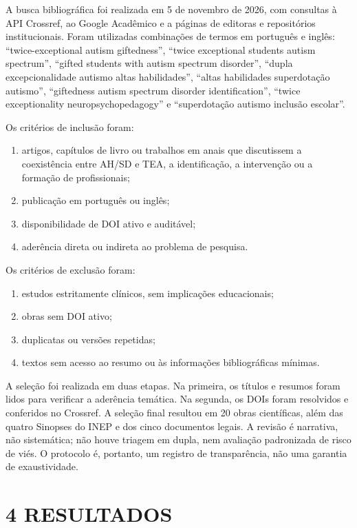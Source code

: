 A busca bibliográfica foi realizada em 5 de novembro de 2026, com
consultas à API Crossref, ao Google Acadêmico e a páginas de editoras e
repositórios institucionais. Foram utilizadas combinações de termos em
português e inglês: ``twice-exceptional autism giftedness'', ``twice
exceptional students autism spectrum'', ``gifted students with autism
spectrum disorder'', ``dupla excepcionalidade autismo altas
habilidades'', ``altas habilidades superdotação autismo'', ``giftedness
autism spectrum disorder identification'', ``twice exceptionality
neuropsychopedagogy'' e ``superdotação autismo inclusão escolar''.

Os critérios de inclusão foram:

\begin{enumerate}
\def\labelenumi{\alph{enumi})}
\item
  artigos, capítulos de livro ou trabalhos em anais que discutissem a
  coexistência entre AH/SD e TEA, a identificação, a intervenção ou a
  formação de profissionais;
\item
  publicação em português ou inglês;
\item
  disponibilidade de DOI ativo e auditável;
\item
  aderência direta ou indireta ao problema de pesquisa.
\end{enumerate}

Os critérios de exclusão foram:

\begin{enumerate}
\def\labelenumi{\alph{enumi})}
\item
  estudos estritamente clínicos, sem implicações educacionais;
\item
  obras sem DOI ativo;
\item
  duplicatas ou versões repetidas;
\item
  textos sem acesso ao resumo ou às informações bibliográficas mínimas.
\end{enumerate}

A seleção foi realizada em duas etapas. Na primeira, os títulos e
resumos foram lidos para verificar a aderência temática. Na segunda, os
DOIs foram resolvidos e conferidos no Crossref. A seleção final resultou
em 20 obras científicas, além das quatro Sinopses do INEP e dos cinco
documentos legais. A revisão é narrativa, não sistemática; não houve
triagem em dupla, nem avaliação padronizada de risco de viés. O
protocolo é, portanto, um registro de transparência, não uma garantia de
exaustividade.

\section{4 RESULTADOS}\label{resultados}

